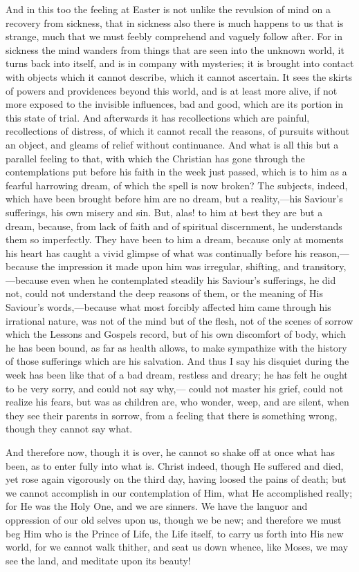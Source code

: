 And in this too the feeling at Easter is not unlike the revulsion
of mind on a recovery from sickness, that in sickness also there is
much happens to us that is strange, much that we must feebly
comprehend and vaguely follow after. For in sickness the mind wanders
from things that are seen into the unknown world, it turns back into
itself, and is in company with mysteries; it is brought into contact
with objects which it cannot describe, which it cannot ascertain. It
sees the skirts of powers and providences beyond this world, and is at
least more alive, if not more exposed to the invisible influences, bad
and good, which are its portion in this state of trial. And afterwards
it has recollections which are painful, recollections of distress, of
which it cannot recall the reasons, of pursuits without an object, and
gleams of relief without continuance. And what is all this but a
parallel feeling to that, with which the Christian has gone through
the contemplations put before his faith in the week just passed, which
is to him as a fearful harrowing dream, of which the spell is now
broken? The subjects, indeed, which have been brought before him are
no dream, but a reality,—his Saviour's sufferings, his own misery
and sin. But, alas! to him at best they are but a dream, because, from
lack of faith and of spiritual discernment, he understands them so
imperfectly. They have been to him a dream, because only at moments
his heart has caught a vivid glimpse of what was continually before
his reason,—because the impression it made upon him was irregular,
shifting, and transitory,—because even when he contemplated steadily
his Saviour's sufferings, he did not, could not understand the deep
reasons of them, or the meaning of His Saviour's words,—because
what most forcibly affected him came through his irrational nature,
was not of the mind but of the flesh, not of the scenes of sorrow
which the Lessons and Gospels record, but of his own discomfort of
body, which he has been bound, as far as health allows, to make
sympathize with the history of those sufferings which are his
salvation. And thus I say his disquiet during the week has been like
that of a bad dream, restless and dreary; he has felt he ought to be
very sorry, and could not say why,— could not master his grief, could
not realize his fears, but was as children are, who wonder, weep, and
are silent, when they see their parents in sorrow, from a feeling that
there is something wrong, though they cannot say what.

And therefore now, though it is over, he cannot so shake off at
once what has been, as to enter fully into what is. Christ indeed,
though He suffered and died, yet rose again vigorously on the third
day, having loosed the pains of death; but we cannot accomplish in our
contemplation of Him, what He accomplished really; for He was the Holy
One, and we are sinners. We have the languor and oppression of our old
selves upon us, though we be new; and therefore we must beg Him who is
the Prince of Life, the Life itself, to carry us forth into His new
world, for we cannot walk thither, and seat us down whence, like
Moses, we may see the land, and meditate upon its beauty!


